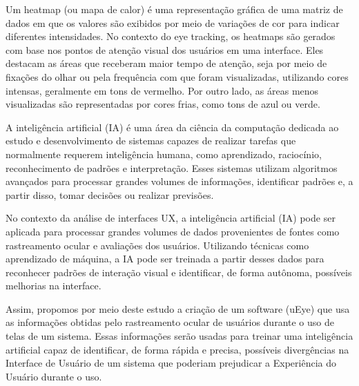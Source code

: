 Um heatmap (ou mapa de calor) é uma representação gráfica de uma matriz de dados em que os valores são exibidos por meio de variações de cor para indicar diferentes intensidades. No contexto do eye tracking, os heatmaps são gerados com base nos pontos de atenção visual dos usuários em uma interface. Eles destacam as áreas que receberam maior tempo de atenção, seja por meio de fixações do olhar ou pela frequência com que foram visualizadas, utilizando cores intensas, geralmente em tons de vermelho. Por outro lado, as áreas menos visualizadas são representadas por cores frias, como tons de azul ou verde.

A inteligência artificial (IA) é uma área da ciência da computação dedicada ao estudo e desenvolvimento de sistemas capazes de realizar tarefas que normalmente requerem inteligência humana, como aprendizado, raciocínio, reconhecimento de padrões e interpretação. Esses sistemas utilizam algoritmos avançados para processar grandes volumes de informações, identificar padrões e, a partir disso, tomar decisões ou realizar previsões.

No contexto da análise de interfaces UX, a inteligência artificial (IA) pode ser aplicada para processar grandes volumes de dados provenientes de fontes como rastreamento ocular e avaliações dos usuários. Utilizando técnicas como aprendizado de máquina, a IA pode ser treinada a partir desses dados para reconhecer padrões de interação visual e identificar, de forma autônoma, possíveis melhorias na interface.

Assim, propomos por meio deste estudo a criação de um software (uEye) que usa as informações obtidas pelo rastreamento ocular de usuários durante o uso de telas de um sistema. Essas informações serão usadas para treinar uma inteligência artificial capaz de identificar, de forma rápida e precisa, possíveis divergências na Interface de Usuário de um sistema que poderiam prejudicar a Experiência do Usuário durante o uso. 


